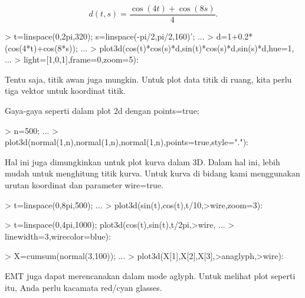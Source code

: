 \documentclass{report}
\begin{document}
\begin{eulernotebook}
\begin{eulercomment}
\begin{eulercomment}
\begin{eulercomment}
\end{eulercomment}
\begin{eulerformula}
\[
d(t,s) = \frac{\cos(4t)+\cos(8s)}{4}.
\]
\end{eulerformula}
\begin{eulerprompt}
> t=linspace(0,2pi,320); s=linspace(-pi/2,pi/2,160)'; ...
> d=1+0.2*(cos(4*t)+cos(8*s)); ...
> plot3d(cos(t)*cos(s)*d,sin(t)*cos(s)*d,sin(s)*d,hue=1, ...
>   light=[1,0,1],frame=0,zoom=5):
\end{eulerprompt}
\begin{eulercomment}
Tentu saja, titik awan juga mungkin. Untuk plot data titik di ruang,
kita perlu tiga vektor untuk koordinat titik.

Gaya-gaya seperti dalam plot 2d dengan points=true;
\end{eulercomment}
\begin{eulerprompt}
> n=500;  ...
>   plot3d(normal(1,n),normal(1,n),normal(1,n),points=true,style="."):
\end{eulerprompt}
\begin{eulercomment}
Hal ini juga dimungkinkan untuk plot kurva dalam 3D. Dalam hal ini,
lebih mudah untuk menghitung titik kurva. Untuk kurva di bidang kami
menggunakan urutan koordinat dan parameter wire=true.
\end{eulercomment}
\begin{eulerprompt}
> t=linspace(0,8pi,500); ...
> plot3d(sin(t),cos(t),t/10,>wire,zoom=3):
\end{eulerprompt}
\begin{eulerprompt}
> t=linspace(0,4pi,1000); plot3d(cos(t),sin(t),t/2pi,>wire, ...
> linewidth=3,wirecolor=blue):
\end{eulerprompt}
\begin{eulerprompt}
> X=cumsum(normal(3,100)); ...
>  plot3d(X[1],X[2],X[3],>anaglyph,>wire):
\end{eulerprompt}
\begin{eulercomment}
EMT juga dapat merencanakan dalam mode aglyph. Untuk melihat plot
seperti itu, Anda perlu kacamata red/cyan glasses.
\end{eulercomment}
\begin{eulerprompt}

\end{eulerprompt}
\end{eulercomment}
\end{eulercomment}
\end{eulernotebook}
\end{document}
